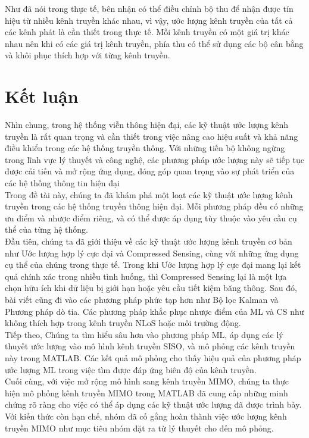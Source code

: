 \documentclass{article}
\begin{document}
Như đã nói trong thực tế, bên nhận có thể điều chỉnh bộ thu để nhận được tín hiệu từ nhiều kênh truyền khác nhau, vì vậy, ước lượng kênh truyền của tất cả các kênh phát là cần thiết trong thực tế. Mỗi kênh truyền có một giá trị khác nhau nên khi có các giá trị kênh truyền, phía thu có thể sử dụng các bộ cân bằng và khôi phục thích hợp với từng kênh truyền. 
\newpage
\section{Kết luận}
Nhìn chung, trong hệ thống viễn thông hiện đại, các kỹ thuật ước lượng kênh truyền là rất quan trọng và cần thiết trong việc nâng cao hiệu suất và khả năng điều khiển trong các hệ thống truyền thông. Với những tiến bộ không ngừng trong lĩnh vực lý thuyết và công nghệ, các phương pháp ước lượng này sẽ tiếp tục được cải tiến và mở rộng ứng dụng, đóng góp quan trọng vào sự phát triển của các hệ thống thông tin hiện đại\\

Trong đề tài này, chúng ta đã khám phá một loạt các kỹ thuật ước lượng kênh truyền trong các hệ thống truyền thông hiện đại. Mỗi phương pháp đều có những ưu điểm và nhược điểm riêng, và có thể được áp dụng tùy thuộc vào yêu cầu cụ thể của từng hệ thống.\\

Đầu tiên, chúng ta đã giới thiệu về các kỹ thuật ước lượng kênh truyền cơ bản như Ước lượng hợp lý cực đại và Compressed Sensing, cùng với những ứng dụng cụ thể của chúng trong thực tế. Trong khi Ước lượng hợp lý cực đại mang lại kết quả chính xác trong nhiều tình huống, thì Compressed Sensing lại là một lựa chọn hữu ích khi dữ liệu bị giới hạn hoặc yêu cầu tiết kiệm băng thông. Sau đó, bài viết cũng đi vào các phương pháp phức tạp hơn như Bộ lọc Kalman và Phương pháp dò tia. Các phương pháp khắc phục nhược điểm của ML và CS như không thích hợp trong kênh truyền NLoS hoặc môi trường động.\\

Tiếp theo, Chúng ta tìm hiểu sâu hơn vào phương pháp ML, áp dụng các lý thuyết ước lượng vào mô hình kênh truyền SISO, và mô phỏng các kênh truyền này trong MATLAB. Các kết quả mô phỏng cho thấy hiệu quả của phương pháp ước lượng ML trong việc tìm được đáp ứng biên độ của kênh truyền.\\

Cuối cùng, với việc mở rộng mô hình sang kênh truyền MIMO, chúng ta thực hiện mô phỏng kênh truyền MIMO trong MATLAB đã cung cấp những minh chứng rõ ràng cho việc có thể áp dụng các kỹ thuật ước lượng đã được trình bày. Với kiến thức còn hạn chế, nhóm đã cố gắng hoàn thành việc ước lượng kênh truyền MIMO như mục tiêu nhóm đặt ra từ lý thuyết cho đến mô phỏng.\\
\end{document}
